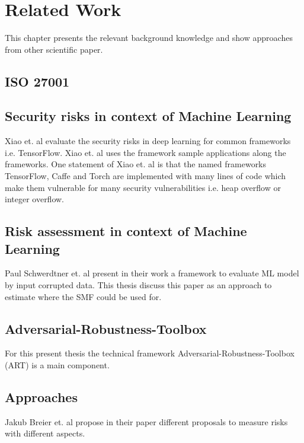 \section{Related Work}
\label{sec:relWork}

This chapter presents the relevant background knowledge and show approaches from other scientific paper.

\subsection{ISO 27001}

\subsection{Security risks in context of Machine Learning}

Xiao et. al \cite{DBLP:conf/sp/XiaoLZX18} evaluate the security risks in deep learning for common frameworks i.e. TensorFlow. Xiao et. al uses the framework sample applications along the frameworks. One statement of Xiao et. al is that the named frameworks TensorFlow, Caffe and Torch are implemented with many lines of code which make them vulnerable for many security vulnerabilities i.e. heap overflow or integer overflow.

\subsection{Risk assessment in context of Machine Learning}

Paul Schwerdtner et. al \cite{DBLP:journals/corr/abs-2011-04328} present in their work a framework to evaluate ML model by input corrupted data. This thesis discuss this paper as an approach to estimate where the SMF could be used for.

\subsection{Adversarial-Robustness-Toolbox}

For this present thesis the technical framework Adversarial-Robustness-Toolbox (ART) \cite{art2018} is a main component.

\subsection{Approaches}

Jakub Breier et. al \cite{DBLP:journals/corr/abs-2012-04884} propose in their paper different proposals to measure risks with different aspects. \\
